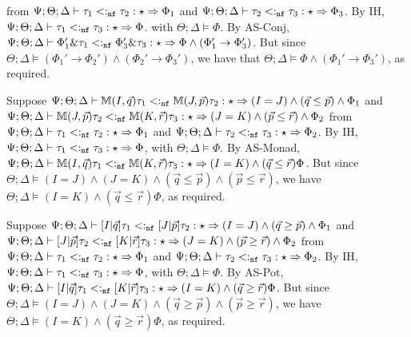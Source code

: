   from $\Psi ; \Theta ; \Delta \vdash \tau_1 <:_{\texttt{nf}} \tau_2 : \star \Rightarrow \Phi_1$ and 
  $\Psi ; \Theta ; \Delta \vdash \tau_2 <:_{\texttt{nf}} \tau_3 : \star \Rightarrow \Phi_3$. By IH,
  $\Psi ; \Theta ; \Delta \vdash \tau_1 <:_{\texttt{nf}} \tau_3 : \star \Rightarrow \Phi$. with $\Theta ; \Delta \vDash \Phi$.
  By AS-Conj, $\Psi ; \Theta ; \Delta \vdash \Phi_1' \& \tau_1 <:_{\texttt{nf}} \Phi_3' \& \tau_3 : \star \Rightarrow \Phi \wedge (\Phi_1' \to \Phi_3')$. But since $\Theta ; \Delta \vDash (\Phi_1' \to \Phi_2') \wedge (\Phi_2' \to \Phi_3')$, we have that $\Theta ; \Delta \vDash \Phi \wedge (\Phi_1' \to \Phi_3')$, as required.
  \item[(AS-Monad)]
  Suppose $\Psi ; \Theta ; \Delta \vdash \mathbb{M}(I,\vec{q}) \tau_1 <:_{\texttt{nf}} \mathbb{M}(J,\vec{p}) \tau_2 : \star \Rightarrow (I = J) \wedge (\vec{q} \leq \vec{p}) \wedge \Phi_1$
  and $\Psi ; \Theta ; \Delta \vdash \mathbb{M}(J,\vec{p}) \tau_2 <:_{\texttt{nf}} \mathbb{M}(K,\vec{r}) \tau_3 : \star \Rightarrow (J = K) \wedge (\vec{p} \leq \vec{r}) \wedge \Phi_2$
  from $\Psi ; \Theta ; \Delta \vdash \tau_1 <:_{\texttt{nf}} \tau_2 : \star \Rightarrow \Phi_1$ and
  $\Psi ; \Theta ; \Delta \vdash \tau_2 <:_{\texttt{nf}} \tau_3 : \star \Rightarrow \Phi_2$.
  By IH, $\Psi ; \Theta ; \Delta \vdash \tau_1 <:_{\texttt{nf}} \tau_3 : \star \Rightarrow \Phi$, with $\Theta ; \Delta \vDash \Phi$.
  By AS-Monad, $\Psi ; \Theta ; \Delta \vdash \mathbb{M}(I,\vec{q}) \tau_1 <:_{\texttt{nf}} \mathbb{M}(K,\vec{r})\tau_3 : \star \Rightarrow (I = K) \wedge (\vec{q} \leq \vec{r}) \Phi$.
  But since $\Theta ; \Delta \vDash (I = J) \wedge (J = K) \wedge (\vec{q} \leq \vec{p}) \wedge (\vec{p} \leq \vec{r})$, we have $\Theta ; \Delta \vDash (I = K) \wedge (\vec{q} \leq \vec{r}) \Phi$, as required.
  \item[(AS-Pot)] Suppose $\Psi ; \Theta ; \Delta \vdash [I|\vec{q}] \tau_1 <:_{\texttt{nf}} [J|\vec{p}] \tau_2 : \star \Rightarrow (I = J) \wedge (\vec{q} \geq \vec{p}) \wedge \Phi_1$
  and $\Psi ; \Theta ; \Delta \vdash [J|\vec{p}] \tau_2 <:_{\texttt{nf}} [K|\vec{r}] \tau_3 : \star \Rightarrow (J = K) \wedge (\vec{p} \geq \vec{r}) \wedge \Phi_2$
  from $\Psi ; \Theta ; \Delta \vdash \tau_1 <:_{\texttt{nf}} \tau_2 : \star \Rightarrow \Phi_1$ and
  $\Psi ; \Theta ; \Delta \vdash \tau_2 <:_{\texttt{nf}} \tau_3 : \star \Rightarrow \Phi_2$.
  By IH, $\Psi ; \Theta ; \Delta \vdash \tau_1 <:_{\texttt{nf}} \tau_3 : \star \Rightarrow \Phi$, with $\Theta ; \Delta \vDash \Phi$.
  By AS-Pot, $\Psi ; \Theta ; \Delta \vdash [I|\vec{q}] \tau_1 <:_{\texttt{nf}} [K|\vec{r}] \tau_3 : \star \Rightarrow (I = K) \wedge (\vec{q} \geq \vec{r}) \Phi$.
  But since $\Theta ; \Delta \vDash (I = J) \wedge (J = K) \wedge (\vec{q} \geq \vec{p}) \wedge (\vec{p} \geq \vec{r})$, we have $\Theta ; \Delta \vDash (I = K) \wedge (\vec{q} \geq \vec{r}) \Phi$, as required.
